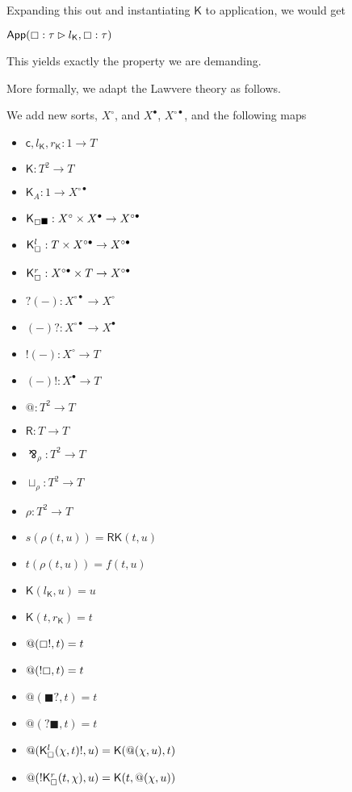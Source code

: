 \documentclass{llncs}
\renewcommand{\:}{\colon}
\begin{document}
Expanding this out and instantiating $\mathsf{K}$ to application, we would get

$\mathsf{App}( \boxempty : \tau \rhd l_{\mathsf{K}}, \boxempty : \tau )$

This yields exactly the property we are demanding.

More formally, we adapt the Lawvere theory as follows.

We add new sorts, $X^{\circ}$, and $X^{\bullet}$, $X^{\circ\bullet}$, and the following maps

\begin{itemize}
  \item $\mathsf{c}, l_{\mathsf{K}}, r_{\mathsf{K}} : 1 \rightarrow T$
  \item $\mathsf{K} : T^{2} \rightarrow T$
  \item $\mathsf{K}_{A} : 1 \rightarrow X^{\circ\bullet}$
  \item $\mathsf{K}_{\boxempty\blacksquare} : X^{\circ} \times X^{\bullet} \rightarrow X^{\circ\bullet}$
  \item $\mathsf{K}_{\boxempty}^{l} : T \times X^{\circ\bullet} \rightarrow X^{\circ\bullet}$
  \item $\mathsf{K}_{\boxempty}^{r} :  X^{\circ\bullet} \times T \rightarrow X^{\circ\bullet}$
  \item $?(-) : X^{\circ\bullet}  \rightarrow X^{\circ}$
  \item $(-)? : X^{\circ\bullet}  \rightarrow X^{\bullet}$
  \item $!(-) : X^{\circ}  \rightarrow T$
  \item $(-)! : X^{\bullet}  \rightarrow T$
  \item $@ : T^{2} \rightarrow T$
  \item $\mathsf{R} : T \rightarrow T$
  \item $\bindnasrepma_{\rho} : T^{2} \rightarrow T$
  \item $\sqcup_{\rho} : T^{2} \rightarrow T$
  \item $\rho : T^{2} \rightarrow T$             %
  \item $s(\rho(t,u)) = \mathsf{R}\mathsf{K}(t, u) $
  \item $t(\rho(t,u)) = f(t,u)$                      %
  \item $\mathsf{K}(l_{\mathsf{K}}, u) = u$
  \item $\mathsf{K}(t, r_{\mathsf{K}}) = t$
  \item $@(\boxempty!,t) = t$
  \item $@(!\boxempty,t) = t$
  \item $@(\blacksquare ?,t) = t$
  \item $@(?\blacksquare,t) = t$
  \item $@(\mathsf{K}_{\boxempty}^{l} (\chi, t)!, u) = \mathsf{K}(@(\chi, u), t)$
  \item $@(!\mathsf{K}_{\boxempty}^{r} (t, \chi), u) = \mathsf{K}(t, @(\chi, u))$
\end{itemize}
\end{document}
